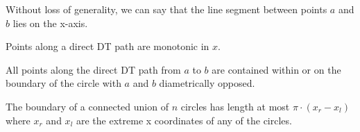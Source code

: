 \documentclass{tufte-handout}
\begin{document}
Without loss of generality, we can say that the line segment between
points $a$ and $b$ lies on the x-axis.

\begin{Lemma}

  Points along a direct DT path are monotonic in $x$.

\end{Lemma}

\begin{Lemma}

  All points along the direct DT path from $a$ to $b$ are contained
  within or on the boundary of the circle with $a$ and $b$
  diametrically opposed.
  
\end{Lemma}

\begin{Lemma}

  The boundary of a connected union of $n$ circles has length at most
  $\pi \cdot ( x_r - x_l )$ where $x_r$ and $x_l$ are the extreme x
  coordinates of any of the circles.
  
\end{Lemma}
\end{document}
